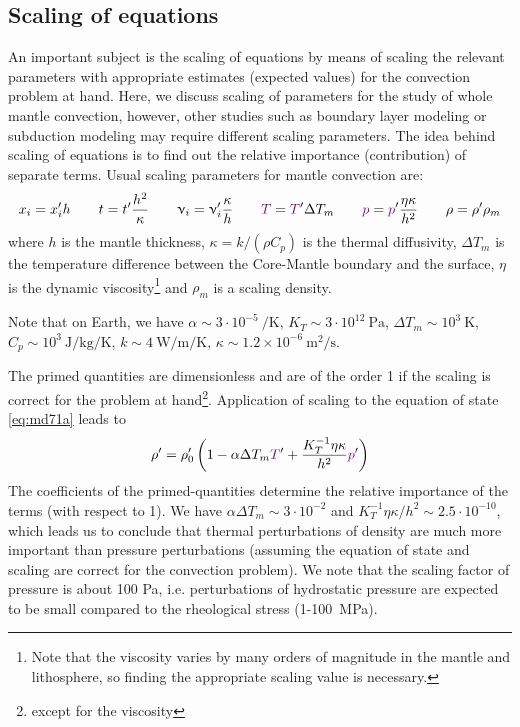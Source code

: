 \subsection{Scaling of equations}


An important subject is the scaling of equations by means of scaling the relevant
parameters with appropriate estimates (expected values) for the convection problem at
hand. Here, we discuss scaling of parameters for the study of whole mantle convection,
however, other studies such as boundary layer modeling or subduction modeling may
require different scaling parameters. The idea behind scaling of equations is to find out
the relative importance (contribution) of separate terms. Usual scaling parameters for
mantle convection are:
\[
x_i = x_i' h
\qquad
t = t' \frac{h^2}{\kappa}
\qquad
\upnu_i = \upnu_i' \frac{\kappa}{h} 
\qquad
{\color{violet} T} = {\color{violet} T}' \Delta T_m
\qquad
{\color{violet} p} = {\color{violet} p}' \frac{\eta \kappa}{h^2}
\qquad
\rho = \rho' \rho_m 
\]
where $h$ is the mantle thickness, $\kappa=k/(\rho C_p)$
is the thermal diffusivity, $\Delta T_m$ is the
temperature difference between the Core-Mantle boundary and the surface,
$\eta$ is the dynamic viscosity\footnote{Note that the viscosity varies by 
many orders of magnitude in the mantle and lithosphere, so finding the appropriate scaling 
value is necessary.} and $\rho_m$ is a scaling density.

Note that on Earth, we have
$\alpha \sim 3\cdot 10^{-5}~\si{\per\kelvin}$,
$K_T \sim 3\cdot 10^{12}~\si{\pascal}$,
$\Delta T_m \sim 10^3~\si{\kelvin}$,
$C_p \sim 10^3~\si{\joule\per\kg\per\kelvin}$,
$k\sim 4~\si{\watt\per\meter\per\kelvin}$,
$\kappa \sim 1.2\times 10^{-6}~\si{\square\meter\per\second}$.

The primed quantities are dimensionless and are of the order 1 if the scaling is correct for
the problem at hand\footnote{except for the viscosity}.
Application of scaling to the equation of state \eqref{eq:md71a} leads to
\begin{equation}
\rho' = \rho_0' \left(  1 - \alpha \Delta T_m {\color{violet} T}' + 
\frac{K_T^{-1}\eta \kappa }{h^2} {\color{violet} p}' \right)
\label{eq:md72}
\end{equation}
The coefficients of the primed-quantities determine the relative importance of the terms
(with respect to 1). We have 
$\alpha \Delta T_m \sim 3\cdot 10^{-2}$ and $K_T^{-1}\eta \kappa/h^2 \sim 2.5\cdot 10^{-10}$,
which leads us to conclude that
thermal perturbations of density are much more important than pressure perturbations
(assuming the equation of state and scaling are correct for the convection problem). We
note that the scaling factor of pressure is about 100 Pa, i.e. perturbations of hydrostatic
pressure are expected to be small compared to the rheological stress (1-100~\si{\mega\pascal}).


